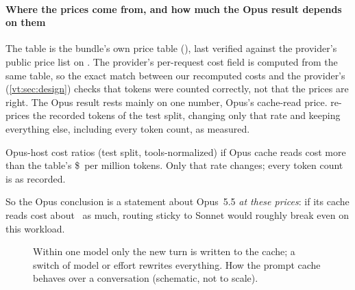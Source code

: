 \paragraph{Where the prices come from, and how much the Opus result depends on them}\label{vt:sec:breakeven}
The table is the bundle's own price table (), last verified against the
provider's public price list on \RatesVerified. The provider's per-request cost field is computed from the
same table, so the exact match between our recomputed costs and the provider's (\cref{vt:sec:design}) checks
that tokens were counted correctly, not that the prices are right. The Opus result rests mainly on one
number, Opus's cache-read price.  re-prices the recorded tokens of the test split,
changing only that rate and keeping everything else, including every token count, as measured.

\begin{table}[tbp]
\centering\small
\caption{Opus-host cost ratios (test split, tools-normalized) if Opus cache reads cost more than the table's
\$\PriceOpusRead\ per million tokens. Only that rate changes; every token count is as recorded.}
\label{vt:tab:breakeven}

\end{table}

So the Opus conclusion is a statement about Opus~5.5 \emph{at these prices}: if its cache reads cost about
\BEReadMultiple\X\ as much, routing sticky to Sonnet would roughly break even on this workload.

\begin{figure}[tbp]
\centering
\begin{adjustbox}{max width=\linewidth}\end{adjustbox}
\caption{Within one model only the new turn is written to the cache; a switch of model or effort rewrites everything. How the prompt cache behaves over a conversation (schematic, not to scale).}
\label{vt:fig:cache}
\end{figure}

